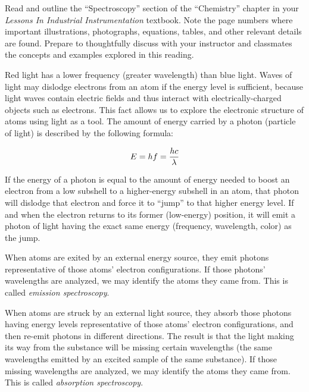 
Read and outline the ``Spectroscopy'' section of the ``Chemistry'' chapter in your {\it Lessons In Industrial Instrumentation} textbook.  Note the page numbers where important illustrations, photographs, equations, tables, and other relevant details are found.  Prepare to thoughtfully discuss with your instructor and classmates the concepts and examples explored in this reading.













Red light has a lower frequency (greater wavelength) than blue light.  Waves of light may dislodge electrons from an atom if the energy level is sufficient, because light waves contain electric fields and thus interact with electrically-charged objects such as electrons.  This fact allows us to explore the electronic structure of atoms using light as a tool.  The amount of energy carried by a photon (particle of light) is described by the following formula:

$$E = hf = {hc \over \lambda}$$

If the energy of a photon is equal to the amount of energy needed to boost an electron from a low subshell to a higher-energy subshell in an atom, that photon will dislodge that electron and force it to ``jump'' to that higher energy level.  If and when the electron returns to its former (low-energy) position, it will emit a photon of light having the exact same energy (frequency, wavelength, color) as the jump.

\vskip 10pt

When atoms are exited by an external energy source, they emit photons representative of those atoms' electron configurations.  If those photons' wavelengths are analyzed, we may identify the atoms they came from.  This is called {\it emission spectroscopy}.

When atoms are struck by an external light source, they absorb those photons having energy levels representative of those atoms' electron configurations, and then re-emit photons in different directions.  The result is that the light making its way from the substance will be missing certain wavelengths (the same wavelengths emitted by an excited sample of the same substance).  If those missing wavelengths are analyzed, we may identify the atoms they came from.  This is called {\it absorption spectroscopy}.

